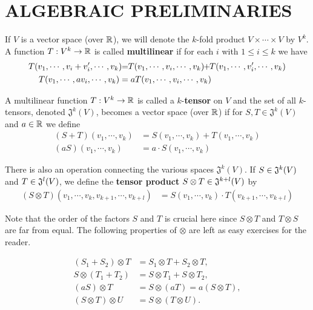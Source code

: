 \section[\textsc{algebraic preliminaries}]{ALGEBRAIC PRELIMINARIES}
If $V$ is a vector space (over $\mathbb{R}$), we will denote the $k$-fold
product $V\times \cdots \times V$ by $V^k$. A function $T:V^k\to \mathbb{R}$
is called \textbf{multilinear} if for each $i$ with $1\le i\le k$ we have 
\begin{align*}
    T(v_1, \cdots, v_i+v_i', \cdots, v_k)
        \hspace*{-3pt}& =\hspace*{-3pt} T(v_1, \cdots, v_i, \cdots, v_k)
        \hspace*{-3pt}+\hspace*{-3pt} T(v_1, \cdots, v_i', \cdots, v_k) \\
    T(v_1, \cdots, av_i, \cdots, v_k) 
        & = aT(v_1, \cdots, v_i,\cdots, v_k)
\end{align*}

A multilinear function $T:V^k\to\mathbb{R}$ is called a $k$-\textbf{tensor} on $V$
and the set of all $k$-tensors, denoted $\mathfrak{J}^k(V)$, becomes a vector
space (over $\mathbb{R}$) if for $S,T \in \mathfrak{J}^k(V)$ and $a\in \mathbb{R}$ we define 
\begin{align*}
    (S+T)(v_1, \cdots, v_k) 
        & = S(v_1, \cdots, v_k)  + T(v_1, \cdots, v_k) \\
    (aS)(v_1, \cdots, v_k) & = a \cdot S(v_1, \cdots, v_k) 
\end{align*}

There is also an operation connecting the various spaces $\mathfrak{J}^k(V)$.
If $S\in \mathfrak{J}^k(V)$ and $T\in \mathfrak{J}^l(V)$, we define the \textbf{tensor product}
$S\otimes T \in \mathfrak{J}^{k+l}(V)$ by
\begin{align*}
    (S\otimes T)(v_1, \cdots, v_k, v_{k+1},\cdots, v_{k+l})
        & = S(v_1, \cdots, v_k) \cdot T(v_{k+1}, \cdots, v_{k+l})
\end{align*}

Note that the order of the factors $S$ and $T$ is crucial here since
$S\otimes T$ and $T\otimes S$ are far from equal. The following 
properties of $\otimes$ are left as easy exercises for the reader.

\begin{align*}
    (S_1+S_2)\otimes T& =S_1\otimes T+S_2\otimes T,  \\
    S\otimes(T_1+T_2)& =S\otimes T_1+S\otimes T_2,  \\
    (a S)\otimes T& =S\otimes(aT)=a(S\otimes T),  \\
    (S \otimes T)\otimes U& =S\otimes(T\otimes U). 
\end{align*}

